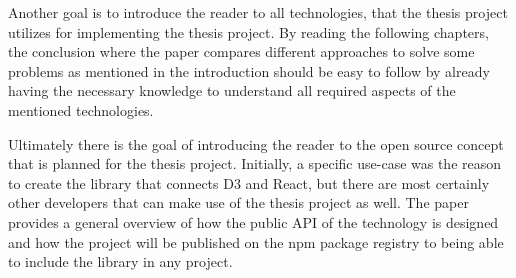 Another goal is to introduce the reader to all technologies, that the thesis project utilizes for implementing the thesis project. By reading the following chapters, the conclusion where the paper compares different approaches to solve some problems as mentioned in the introduction should be easy to follow by already having the necessary knowledge to understand all required aspects of the mentioned technologies.

Ultimately there is the goal of introducing the reader to the open source concept that is planned for the thesis project. Initially, a specific use-case was the reason to create the library that connects D3 and React, but there are most certainly other developers that can make use of the thesis project as well. The paper provides a general overview of how the public API of the technology is designed and how the project will be published on the npm package registry to being able to include the library in any project.



